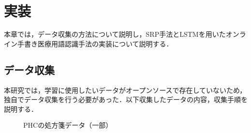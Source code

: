 
\chapter{実装}
\label{cha:imple}
本章では，データ収集の方法について説明し，SRP手法とLSTMを用いたオンライン手書き医療用語認識手法の実装について説明する．
\section{データ収集}
\label{sec:collection}
本研究では，学習に使用したいデータがオープンソースで存在していないため，独自でデータ収集を行う必要があった．以下収集したデータの内容，収集手順を説明する．

\begin{figure}[tb]
 \begin{center}
  \caption{PHCの処方箋データ（一部）}
  \label{corpus}
\end{center}
\end{figure}

